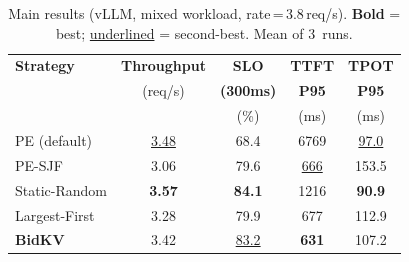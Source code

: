 \begin{table}[t]
\centering
\caption{Main results (vLLM, mixed workload, rate\,=\,3.8\,req/s).
  \textbf{Bold} = best; \underline{underlined} = second-best. Mean of 3~runs.}
\label{tab:main}
\small
\begin{tabular}{@{}l c c c c@{}}
\toprule
\textbf{Strategy}
  & \textbf{Throughput}  & \textbf{SLO}     & \textbf{TTFT}
  & \textbf{TPOT} \\
  & (req/s)  & \textbf{(300ms)} & \textbf{P95}
  & \textbf{P95} \\
  &           & (\%)             & (ms)
  & (ms) \\
\midrule
PE (default)             & \underline{3.48}     & 68.4              & 6769              & \underline{97.0} \\
PE-SJF                   & 3.06              & 79.6              & \underline{666}   & 153.5 \\
Static-Random            & \textbf{3.57}     & \textbf{84.1}     & 1216              & \textbf{90.9} \\
Largest-First            & 3.28              & 79.9              & 677               & 112.9 \\
\textbf{BidKV}           & 3.42              & \underline{83.2}  & \textbf{631}      & 107.2 \\
\bottomrule
\end{tabular}
\end{table}